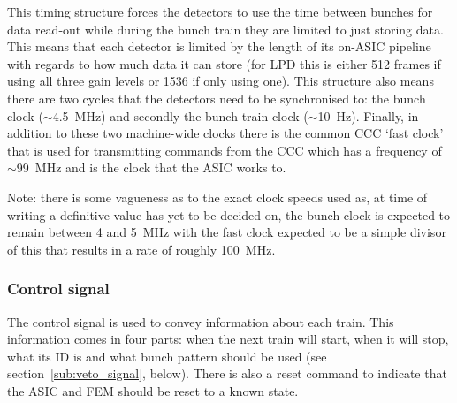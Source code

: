 This timing structure forces the detectors to use the time between bunches for data read-out while during the bunch train they are limited to just storing data. This means that each detector is limited by the length of its on-ASIC pipeline with regards to how much data it can store (for LPD this is either 512 frames if using all three gain levels or 1536 if only using one). This structure also means there are two cycles that the detectors need to be synchronised to: the bunch clock (\(\sim\)4.5~MHz) and secondly the bunch-train clock (\(\sim\)10~Hz). Finally, in addition to these two machine-wide clocks there is the common CCC `fast clock' that is used for transmitting commands from the CCC which has a frequency of \(\sim\)99~MHz and is the clock that the ASIC works to.

Note: there is some vagueness as to the exact clock speeds used as, at time of writing a definitive value has yet to be decided on, the bunch clock is expected to remain between 4 and 5~MHz with the fast clock expected to be a simple divisor of this that results in a rate of roughly 100~MHz. 
\subsubsection{Control signal} %
\label{sub:control_signal}
The control signal is used to convey information about each train. This information comes in four parts: when the next train will start, when it will stop, what its ID is and what bunch pattern should be used (see section~\ref{sub:veto_signal}, below). There is also a reset command to indicate that the ASIC and FEM should be reset to a known state. 

